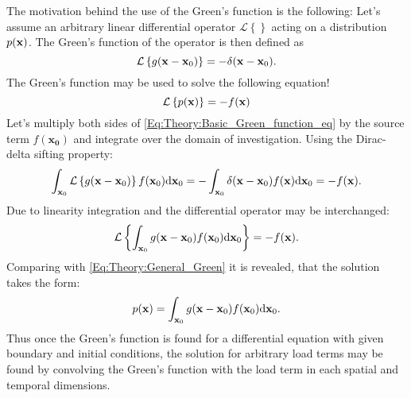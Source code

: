 The motivation behind the use of the Green's function is the following:
Let's assume an arbitrary linear differential operator $\mathcal{L}\left\{ \right\}$ acting on a distribution $p(\mathbf{x})$. The Green's function of the operator is then defined as
\begin{equation}
\mathcal{L}\left\{ g(\mathbf{x}-\mathbf{x}_0) \right\} = -\delta( \mathbf{x}-\mathbf{x}_0 ).
\label{Eq:Theory:Basic_Green_function_eq}
\end{equation}
The Green's function may be used to solve the following equation!
\begin{equation}
\mathcal{L}\left\{ p(\mathbf{x}) \right\} = -f(\mathbf{x})
\label{Eq:Theory:General_Green}
\end{equation}
Let's multiply both sides of \eqref{Eq:Theory:Basic_Green_function_eq} by the source term $f(\mathbf{x_0})$ and integrate over the domain of investigation. Using the Dirac-delta sifting property:
\begin{equation}
\int_{\mathbf{x}_0} \mathcal{L}\left\{ g(\mathbf{x}-\mathbf{x}_0) \right\} f(\mathbf{x}_0) \mathrm{d} \mathbf{x}_0  = -\int_{\mathbf{x}_0 } \delta( \mathbf{x}-\mathbf{x}_0 ) f(\mathbf{x}) \mathrm{d} \mathbf{x}_0  = -f(\mathbf{x}).
\end{equation}
Due to linearity integration and the differential operator may be interchanged:
\begin{equation}
\mathcal{L}\left\{ \int_{\mathbf{x}_0 }  g(\mathbf{x}-\mathbf{x}_0) f(\mathbf{x}_0) \mathrm{d} \mathbf{x}_0  \right\} 
= -f(\mathbf{x}).
\end{equation}
Comparing with \eqref{Eq:Theory:General_Green} it is revealed, that the solution takes the form:
\begin{equation}
p(\mathbf{x}) = \int_{\mathbf{x}_0 }  g(\mathbf{x}-\mathbf{x}_0) f(\mathbf{x}_0) \mathrm{d} \mathbf{x}_0.
\end{equation}
Thus once the Green's function is found for a differential equation with given boundary and initial conditions, the solution for arbitrary load terms may be found by convolving the Green's function with the load term in each spatial and temporal dimensions.

